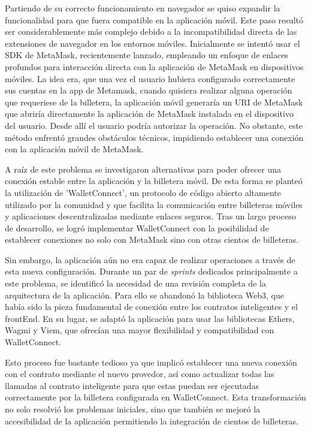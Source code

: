 Partiendo de su correcto funcionamiento en navegador se quiso expandir la funcionalidad para que fuera compatible en la aplicación móvil.
Este paso resultó ser considerablemente más complejo debido a la incompatibilidad directa de las extensiones de navegador en los entornos móviles. 
Inicialmente se intentó usar el SDK de MetaMask, recientemente lanzado, empleando un enfoque de enlaces profundos para interacción directa con la aplicación de MetaMask en dispositivos móviles.
La idea era, que una vez el usuario hubiera configurado correctamente sus cuentas en la app de Metamask, cuando quisiera realizar alguna operación que requeriese de la billetera, la aplicación móvil generaría un URI de MetaMask que abriría directamente la aplicación de MetaMask instalada en el dispositivo del usuario. Desde allí el usuario podría autorizar la operación.
No obstante, este método enfrentó grandes obstáculos técnicos, impidiendo establecer una conexión con la aplicación móvil de MetaMask.

A raíz de este problema se investigaron alternativas para poder ofrecer una conexión estable entre la aplicación y la billetera móvil. De esta forma se planteó la utilización de 'WalletConnect', un protocolo de código abierto altamente utilizado por la comunidad y que facilita la comunicación entre billeteras móviles y aplicaciones descentralizadas mediante enlaces seguros. Tras un largo proceso de desarrollo, se logró implementar WalletConnect con la posibilidad de establecer conexiones no solo con MetaMask sino con otras cientos de billeteras.

Sin embargo, la aplicación aún no era capaz de realizar operaciones a través de esta nueva configuración. Durante un par de \textit{sprints} dedicados principalmente a este problema, se identificó la necesidad de una revisión completa de la arquitectura de la aplicación. 
Para ello se abandonó la biblioteca Web3, que había sido la pieza fundamental de conexión entre los contratos inteligentes y el frontEnd.
En su lugar, se adaptó la aplicación para usar las bibliotecas Ethers, Wagmi y Viem, que ofrecían una mayor flexibilidad y compatibilidad con WalletConnect.

Esto proceso fue bastante tedioso ya que implicó establecer una nueva conexión con el contrato mediante el nuevo provedor, así como actualizar todas las llamadas al contrato inteligente para que estas puedan ser ejecutadas correctamente por la billetera configurada en WalletConnect.
Esta transformación no solo resolvió los problemas iniciales, sino que también se mejoró la accesibilidad de la aplicación permitiendo la integración de cientos de billeteras.



